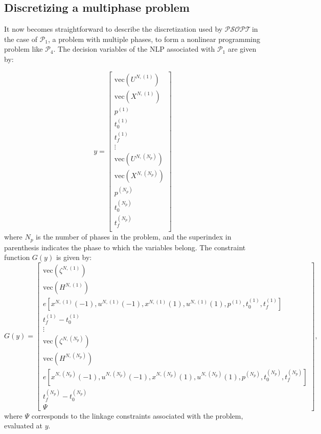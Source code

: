 \documentclass[a4paper,11pt]{report}    %
\newcommand{\psopt}{$\mathcal{PSOPT}$\,}  %
\begin{document}
\subsection{Discretizing a multiphase problem}

It now becomes straightforward to describe the discretization used by \psopt in the case of
$\mathcal{P}_1$, a problem with multiple phases, to form a nonlinear programming problem like $\mathcal{P}_4$. 
The decision variables of the NLP associated with $\mathcal{P}_1$ are given by:

\begin{equation}
   y = \begin{bmatrix}
          \mathrm{vec}(U^{N,(1)}) \\
          \mathrm{vec}(X^{N,(1)}) \\
          p^{(1)}        \\
          t_0^{(1)}      \\
          t_f^{(1)}  \\
          \vdots \\
          \mathrm{vec}(U^{N,(N_p)}) \\
          \mathrm{vec}(X^{N,(N_p)}) \\
          p^{(N_p)}        \\
          t_0^{(N_p)}      \\
          t_f^{(N_p)}  \\
       \end{bmatrix}
\end{equation}
where $N_p$ is the number of phases in the problem, and the superindex in parenthesis indicates the phase 
to which the variables belong. The constraint function $G(y)$ is given by:
\begin{equation}
         G(y) = \begin{bmatrix}
         \mathrm{vec}(\zeta^{N, (1)}) \\
         \mathrm{vec}(H^{N, (1)}) \\
         e[ x^{N,(1)}(-1),u^{N,(1)}(-1),x^{N,(1)}(1),u^{N,(1)}(1),p^{(1)},t_0^{(1)}, t_f^{(1)} ]  \\
         t_f^{(1)} - t_0^{(1)} \\
         \vdots \\
         \mathrm{vec}(\zeta^{N, (N_p)}) \\
         \mathrm{vec}(H^{N, (N_p)}) \\
         e[ x^{N,(N_p)}(-1),u^{N,(N_p)}(-1),x^{N,(N_p)}(1),u^{N,(N_p)}(1),p^{(N_p)},t_0^{(N_p)}, t_f^{(N_p)} ]  \\
         t_f^{(N_p)} - t_0^{(N_p)} \\
          \Psi
       \end{bmatrix}, 
\end{equation}
where $\Psi$ corresponds to the linkage constraints associated with the problem, evaluated at $y$.
\end{document}
